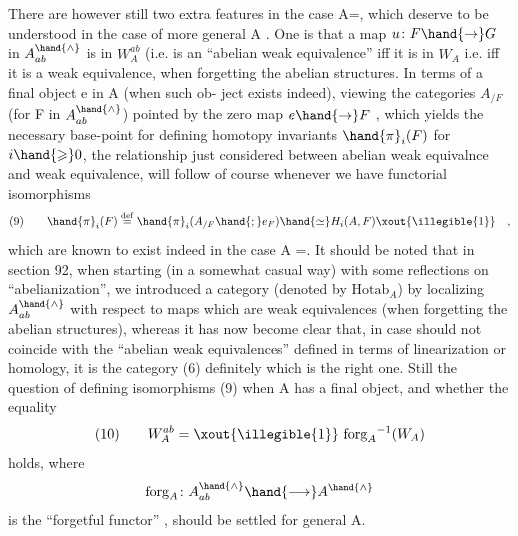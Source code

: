 There are however still two  extra features in the case A=\hand{$\Delta$}, which
deserve to be understood in the case of more general A . One is that
a map $u\colon F\hand{\to} G$ in $A^{\hand{\wedge}}_{ab}$ is in $W^{ab}_A$ (i.e. is an ``abelian weak equivalence''\hand{)}
iff it is in $W_A$ i.e. iff it is a weak equivalence, when forgetting the
abelian structures. In terms of a final object e in A (when such ob-%
ject exists indeed), viewing the categories $A_{/F}$ (for F in $A^{\hand{\wedge}}_{ab}$) pointed 
by the zero map $e \hand{\to} F$ , which yields the necessary base-point  for
defining homotopy invariants $\hand{\pi}_i(F)$ for $i \hand{\geqslant} 0$, the relationship just
considered between abelian weak equivalnce and weak equivalence, will
follow of course whenever we have functorial isomorphisms
\[ (9) \qquad \hand{\pi}_i(F) \overset{\mathrm{def}}{=} \hand{\pi}_i(A_{/F} \hand{;} e_F) \hand{\simeq} H_i(A,F) \xout{\illegible{1}} \quad , \]
which are known to exist indeed in the case A =\hand{$\Delta$}. It should be noted
that in section 92, when starting (in a somewhat casual way) with some
reflections on ``abelianization'', we introduced a category (denoted
by $\mathrm{Hotab}_A$) by localizing $A^{\hand{\wedge}}_{ab}$ with respect to  maps which are weak
equivalences (when forgetting the abelian structures), whereas it has
now become clear that, in case   should not coincide with
the  ``abelian weak equivalences'' defined in terms of linearization
or homology, it is the category (6) definitely which is the right one.
Still the question of defining isomorphisms (9) when A has a final
object, and whether the equality
\[ (10) \qquad W^{ab}_A = \xout{\illegible{1}} \ \mathrm{forg}_A{}^{-1}(W_A) \]
holds, where
\[ \mathrm{forg}_A\colon A^{\hand{\wedge}}_{ab} \hand{\longrightarrow} A^{\hand{\wedge}} \]
is the ``forgetful functor'' , should be settled for general A.


